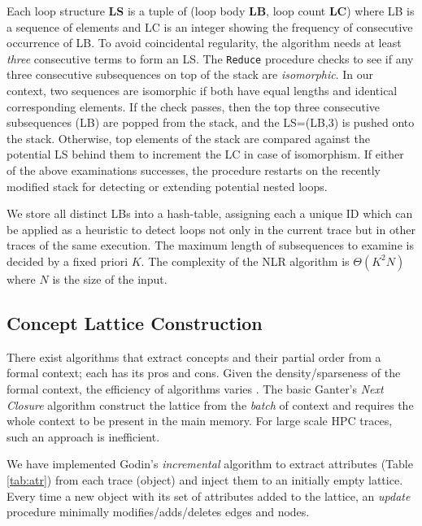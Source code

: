 Each loop structure \textbf{LS} is a tuple of (loop body \textbf{LB}, loop count \textbf{LC}) where LB is a sequence of elements and LC is an integer showing the frequency of consecutive occurrence of LB.
%
To avoid coincidental regularity, the algorithm needs at least \textit{three} consecutive terms to form an LS.
%
The \texttt{Reduce} procedure checks to see if any three consecutive subsequences on top of the stack are \textit{isomorphic}.
%
In our context, two sequences are isomorphic if both have equal lengths and identical corresponding elements.
%
If the check passes, then the top three consecutive subsequences (LB) are popped from the stack, and the LS=(LB,3) is pushed onto the stack. Otherwise, top elements of the stack are compared against the potential LS behind them to increment the LC in case of isomorphism.
If either of the above examinations successes, the procedure restarts on the recently modified stack for detecting or extending potential nested loops.
%

We store all distinct LBs into a hash-table, assigning each a unique ID which can be applied as a heuristic to detect loops not only in the current trace but in other traces of the same execution.
%
The maximum length of subsequences to examine is decided by a fixed priori $K$.
%
The complexity of the NLR algorithm is $\Theta(K^2N)$ where $N$ is the size of the input. 
%

\subsection{Concept Lattice Construction}
\label{subsec:algo-cl}

There exist algorithms that extract concepts and their partial order from a formal context; each has its pros and cons.
%
Given the density/sparseness of the formal context, the efficiency of algorithms varies \cite{clgenperform}.
%
The basic Ganter's \textit{Next Closure} algorithm \cite{clbook} construct the lattice from the \textit{batch} of context and requires the whole context to be present in the main memory.
%
For large scale HPC traces, such an approach is inefficient.
%


We have implemented Godin's \textit{incremental} algorithm \cite{clconst} to extract attributes (Table \ref{tab:atr}) from each trace (object) and inject them to an initially empty lattice.
%
Every time a new object with its set of attributes added to the lattice, an \textit{update} procedure minimally modifies/adds/deletes edges and nodes.


